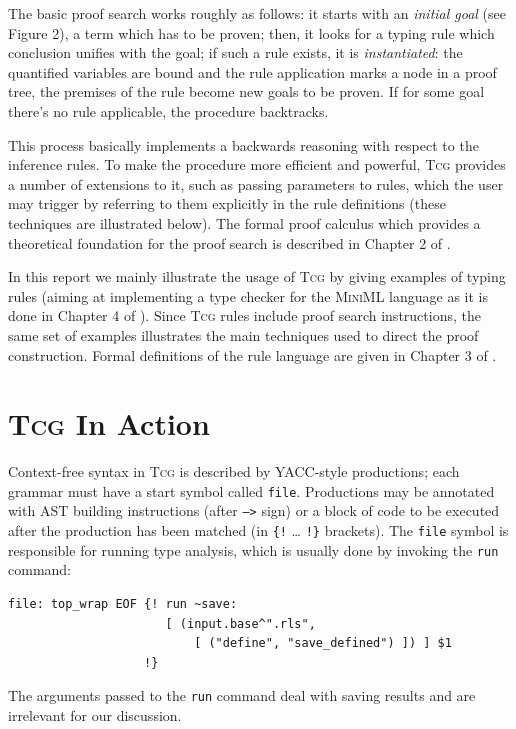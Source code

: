 \documentclass[screen]{beamer}
\newcommand{\Tcg}{\textsc{Tcg}}
\newcommand{\code}[1]{\texttt{#1}}
\newcounter{premise}
\begin{document}
The basic proof search works roughly as follows: it starts with an \emph{initial goal} (see Figure 2), a term which has to be proven; then, it looks for a typing rule which conclusion unifies with the goal; if such a rule exists, it is \emph{instantiated}: the quantified variables are bound and the rule application marks a node in a proof tree, the premises of the rule become new goals to be proven. If for some goal there's no rule applicable, the procedure backtracks. 

This process basically implements a backwards reasoning with respect to the inference rules. To make the procedure more efficient and powerful, \Tcg{} provides a number of extensions to it, such as passing parameters to rules, which the user may trigger by referring to them explicitly in the rule definitions (these techniques are illustrated below). The formal proof calculus which provides a theoretical foundation for the proof search is described in Chapter 2 of \cite{Tcg}.

In this report we mainly illustrate the usage of \Tcg{} by giving examples of typing rules (aiming at implementing a type checker for the \textsc{MiniML} language \cite{MiniML} as it is done in Chapter 4 of \cite{Tcg}).
Since \Tcg{} rules include proof search instructions, the same set of examples illustrates the main techniques used to direct the proof construction. Formal definitions of the rule language are given in Chapter 3 of \cite{Tcg}.


\section{\Tcg{} In Action}

Context-free syntax in \Tcg{} is described by YACC-style productions; each grammar must have a start symbol called \code{file}. Productions may be annotated with AST building instructions (after \code{-->} sign) or a block of code to be executed after the production has been matched (in \code{\{!} \ldots{} \code{!\}} brackets). The \code{file} symbol is responsible for running type analysis, which is usually done by invoking the \code{run} command:

\begin{verbatim}
file: top_wrap EOF {! run ~save: 
                      [ (input.base^".rls",
                          [ ("define", "save_defined") ]) ] $1 
                   !}
\end{verbatim}

The arguments passed to the \code{run} command deal with saving results and are irrelevant for our discussion.
\end{document}
